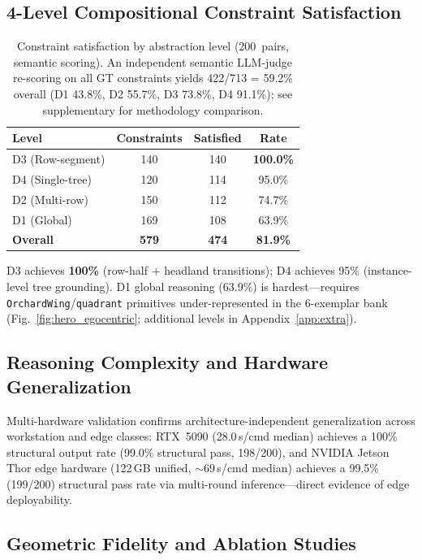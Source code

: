 \documentclass{article}
\begin{document}
\subsection{4-Level Compositional Constraint Satisfaction}

\begin{table}[t]
\centering
\caption{Constraint satisfaction by abstraction level (200~pairs, semantic scoring). An independent semantic LLM-judge re-scoring on all GT constraints yields 422/713 = 59.2\% overall (D1 43.8\%, D2 55.7\%, D3 73.8\%, D4 91.1\%); see supplementary for methodology comparison.}
\label{tab:constraints}
\small
\setlength{\tabcolsep}{4pt}
\begin{tabular}{lccc}
\toprule
Level & Constraints & Satisfied & Rate \\
\midrule
D3 (Row-segment) & 140 & 140 & \textbf{100.0\%} \\
D4 (Single-tree) & 120 & 114 & 95.0\% \\
D2 (Multi-row) & 150 & 112 & 74.7\% \\
D1 (Global) & 169 & 108 & 63.9\% \\
\midrule
\textbf{Overall} & \textbf{579} & \textbf{474} & \textbf{81.9\%} \\
\bottomrule
\end{tabular}
\end{table}

D3 achieves \textbf{100\%} (row-half + headland transitions); D4 achieves 95\% (instance-level tree grounding). D1 global reasoning (63.9\%) is hardest---requires \texttt{OrchardWing}/\texttt{quadrant} primitives under-represented in the 6-exemplar bank (Fig.~\ref{fig:hero_egocentric}; additional levels in Appendix~\ref{app:extra}).
\subsection{Reasoning Complexity and Hardware Generalization}

Multi-hardware validation confirms architecture-independent generalization across workstation and edge classes: RTX~5090 (28.0\,s/cmd median) achieves a 100\% structural output rate (99.0\% structural pass, 198/200), and NVIDIA Jetson Thor edge hardware (122\,GB unified, ${\sim}69\,$s/cmd median) achieves a 99.5\% (199/200) structural pass rate via multi-round inference---direct evidence of edge deployability.

\subsection{Geometric Fidelity and Ablation Studies}
\end{document}
